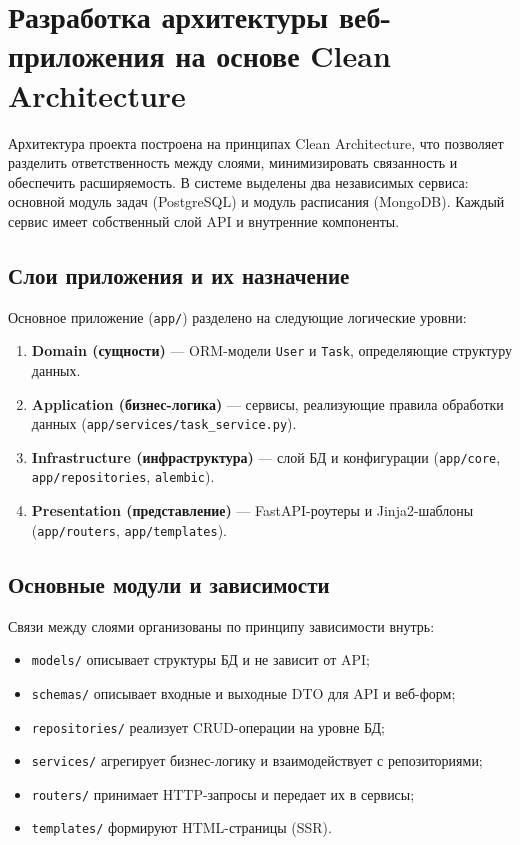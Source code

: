\section{Разработка архитектуры веб-приложения на основе Clean Architecture}

Архитектура проекта построена на принципах Clean Architecture, что позволяет разделить ответственность между слоями, минимизировать связанность и обеспечить расширяемость. В системе выделены два независимых сервиса: основной модуль задач (PostgreSQL) и модуль расписания (MongoDB). Каждый сервис имеет собственный слой API и внутренние компоненты.

\subsection{Слои приложения и их назначение}

Основное приложение (\texttt{app/}) разделено на следующие логические уровни:
\begin{enumerate}
    \item \textbf{Domain (сущности)} --- ORM-модели \texttt{User} и \texttt{Task}, определяющие структуру данных.
    \item \textbf{Application (бизнес-логика)} --- сервисы, реализующие правила обработки данных (\texttt{app/services/task\_service.py}).
    \item \textbf{Infrastructure (инфраструктура)} --- слой БД и конфигурации (\texttt{app/core}, \texttt{app/repositories}, \texttt{alembic}).
    \item \textbf{Presentation (представление)} --- FastAPI-роутеры и Jinja2-шаблоны (\texttt{app/routers}, \texttt{app/templates}).
\end{enumerate}

\subsection{Основные модули и зависимости}

Связи между слоями организованы по принципу зависимости внутрь:
\begin{itemize}
    \item \texttt{models/} описывает структуры БД и не зависит от API;
    \item \texttt{schemas/} описывает входные и выходные DTO для API и веб-форм;
    \item \texttt{repositories/} реализует CRUD-операции на уровне БД;
    \item \texttt{services/} агрегирует бизнес-логику и взаимодействует с репозиториями;
    \item \texttt{routers/} принимает HTTP-запросы и передает их в сервисы;
    \item \texttt{templates/} формируют HTML-страницы (SSR).
\end{itemize}

